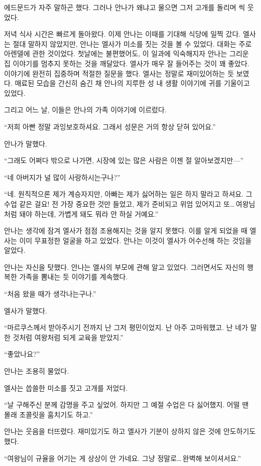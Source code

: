 에드문드가 자주 말하곤 했다. 그러나 안나가 왜냐고 물으면 그저 고개를 돌리며 씩 웃었다.

저녁 식사 시간은 빠르게 돌아왔다. 이제 안나는 이때를 기대해 식당에 일찍 갔다. 엘사는 절대 말하지 않았지만, 안나는 엘사가 미소를 짓는 것을 볼 수 있었다. 대화는 주로 아렌델에 관한 것이었다. 첫날에는 불편했어도, 이 일과에 익숙해지자 안나는 그리운 집 이야기를 멈추지 못하는 것을 깨달았다. 엘사가 매우 잘 들어주는 것이 꽤 좋았다. 이야기에 완전히 집중하며 적절한 질문을 했다. 엘사는 정말로 재미있어하는 듯 보였다. 매료된 모습을 간신히 숨긴 채 안나의 지루한 성 내 생활 이야기에 귀를 기울이고 있었다.

그리고 어느 날, 이들은 안나의 가족 이야기에 이르렀다.

``저희 아빤 정말 과잉보호하셔요. 그래서 성문은 거의 항상 닫혀 있어요.''

안나가 말했다.

``그래도 어쩌다 밖으로 나가면, 시장에 있는 많은 사람은 이젠 절 알아보겠지만—''

``네 아버지가 널 많이 사랑하시는구나?''

``네. 원칙적으론 제가 계승자지만, 아빠는 제가 싫어하는 일은 하지 말라고 하셔요. 그 수업 같은 걸요! 전 가장 중요한 것만 들었고, 제가 준비되고 위엄 있어지고 또\ldots\,여왕님처럼 돼야 하는데, 가볍게 돼도 뭐라 안 하실 거예요.''

안나는 생각에 잠겨 엘사가 점점 조용해지는 것을 알지 못했다. 이를 알게 되었을 때 엘사는 이미 무표정한 얼굴을 하고 있었다. 안나는 이것이 엘사가 어수선해 하는 것임을 알았다.

안나는 자신을 탓했다. 안나는 엘사의 부모에 관해 알고 있었다. 그러면서도 자신의 행복한 가족을 뽐내는 듯 이야기를 계속했다.

`` 처음 왔을 때가 생각나는구나.''

엘사가 말했다.

``마르쿠스께서 받아주시기 전까지 난 그저 평민이었지. 난 아주 고마워했고. 난 네가 말한 것처럼 여왕처럼 되게 교육을 받았지.''

``좋았나요?''

안나는 조용히 물었다.

엘사는 씁쓸한 미소를 짓고 고개를 저었다.

``날 구해주신 분께 감명을 주고 싶었어. 하지만 그 예절 수업은 다 싫어했지. 어떨 땐 몰래 초콜릿을 훔치기도 하고.''

안나는 웃음을 터뜨렸다. 재미있기도 하고 엘사가 기분이 상하지 않은 것에 안도하기도 했다.

``여왕님이 규율을 어기는 게 상상이 안 가네요. 그냥 정말로\ldots\,완벽해 보이셔서요.''


